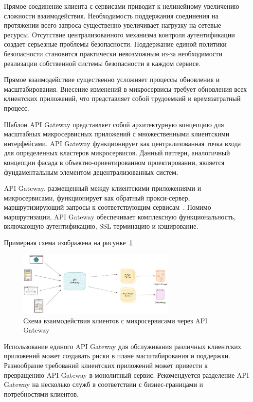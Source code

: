Прямое соединение клиента с сервисами приводит к нелинейному увеличению сложности взаимодействия. Необходимость поддержания соединения на протяжении всего запроса существенно увеличивает нагрузку на сетевые ресурсы.
Отсутствие централизованного механизма контроля аутентификации создает серьезные проблемы безопасности. Поддержание единой политики безопасности становится практически невозможным из-за необходимости реализации собственной системы безопасности в каждом сервисе.

Прямое взаимодействие существенно усложняет процессы обновления и масштабирования.
Внесение изменений в микросервисы требует обновления всех клиентских приложений, что представляет собой трудоемкий и времязатратный процесс.


Шаблон API Gateway представляет собой архитектурную концепцию для масштабных микросервисных приложений с множественными клиентскими интерфейсами.
API Gateway функционирует как централизованная точка входа для определенных кластеров микросервисов. Данный паттерн, аналогичный концепции фасада в объектно-ориентированном проектировании, является фундаментальным элементом децентрализованных систем.

API Gateway, размещенный между клиентскими приложениями и микросервисами, функционирует как обратный прокси-сервер, маршрутизирующий запросы к соответствующим сервисам~\cite{zhao2018management}. Помимо маршрутизации, API Gateway обеспечивает комплексную функциональность, включающую аутентификацию, SSL-терминацию и кэширование.

Примерная схема изображена на рисунке~\ref{fig:api_gateway_interaction}
\begin{figure}[htbp]
    \centering
    \includegraphics[width=0.7\textwidth]{Dissertation/images/gateway_project_scheme}
    \caption{Схема взаимодействия клиентов с микросервисами через API Gateway}
    \label{fig:api_gateway_interaction}
\end{figure}

Использование единого API Gateway для обслуживания различных клиентских приложений может создавать риски в плане масштабирования и поддержки. Разнообразие требований клиентских приложений может привести к превращению API Gateway в монолитный сервис.
Рекомендуется разделение API Gateway на несколько служб в соответствии с бизнес-границами и потребностями клиентов.


